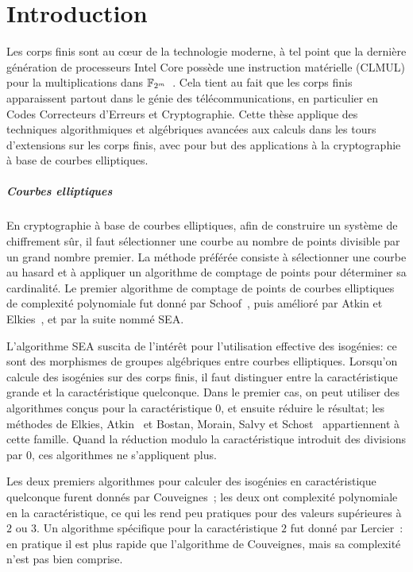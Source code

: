 \chapter*{Introduction}

Les corps finis sont au cœur de la technologie moderne, à tel point
que la dernière génération de processeurs Intel Core possède une
instruction matérielle (CLMUL) pour la multiplications dans
$\mathbb{F}_{2^m}$~\cite{intel-carryless}. Cela tient au fait que les corps
finis apparaissent partout dans le génie des télécommunications, en
particulier en Codes Correcteurs d'Erreurs et Cryptographie. Cette
thèse applique des techniques algorithmiques et algébriques avancées
aux calculs dans les tours d'extensions sur les corps finis, avec pour
but des applications à la cryptographie à base de courbes elliptiques.

\paragraph*{Courbes elliptiques}
En cryptographie à base de courbes elliptiques, afin de construire un
système de chiffrement sûr, il faut sélectionner une courbe au nombre
de points divisible par un grand nombre premier. La méthode préférée
consiste à sélectionner une courbe au hasard et à appliquer un
algorithme de comptage de points pour déterminer sa cardinalité. Le
premier algorithme de comptage de points de courbes elliptiques de
complexité polynomiale fut donné par Schoof~\cite{schoof85}, puis
amélioré par Atkin et Elkies~\cite{atkin88,elkies98,schoof95}, et par
la suite nommé SEA.

L'algorithme SEA suscita de l'intérêt pour l'utilisation effective des
isogénies: ce sont des morphismes de groupes algébriques entre courbes
elliptiques. Lorsqu'on calcule des isogénies sur des corps finis, il
faut distinguer entre la caractéristique grande et la caractéristique
quelconque. Dans le premier cas, on peut utiliser des algorithmes
conçus pour la caractéristique $0$, et ensuite réduire le résultat;
les méthodes de Elkies\cite{elkies98,morain95}, Atkin~\cite{schoof95}
et Bostan, Morain, Salvy et Schost~\cite{bostan+morain+salvy+schost08}
appartiennent à cette famille. Quand la réduction modulo la
caractéristique introduit des divisions par $0$, ces algorithmes ne
s'appliquent plus.

Les deux premiers algorithmes pour calculer des isogénies en
caractéristique quelconque furent donnés par
Couveignes~\cite{couveignes94,couveignes96}; les deux ont complexité
polynomiale en la caractéristique, ce qui les rend peu pratiques pour
des valeurs supérieures à $2$ ou $3$. Un algorithme spécifique pour la
caractéristique $2$ fut donné par Lercier~\cite{lercier96}: en
pratique il est plus rapide que l'algorithme de Couveignes, mais sa
complexité n'est pas bien comprise.

